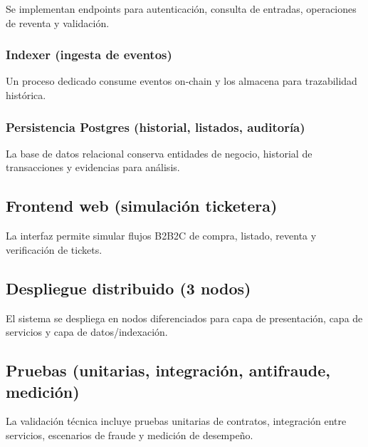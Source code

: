 Se implementan endpoints para autenticación, consulta de entradas, operaciones de reventa y validación.

\subsubsection{Indexer (ingesta de eventos)}

Un proceso dedicado consume eventos on-chain y los almacena para trazabilidad histórica.

\subsubsection{Persistencia Postgres (historial, listados, auditoría)}

La base de datos relacional conserva entidades de negocio, historial de transacciones y evidencias para análisis.

\subsection{Frontend web (simulación ticketera)}

La interfaz permite simular flujos B2B2C de compra, listado, reventa y verificación de tickets.

\subsection{Despliegue distribuido (3 nodos)}

El sistema se despliega en nodos diferenciados para capa de presentación, capa de servicios y capa de datos/indexación.

\subsection{Pruebas (unitarias, integración, antifraude, medición)}

La validación técnica incluye pruebas unitarias de contratos, integración entre servicios, escenarios de fraude y medición de desempeño.

